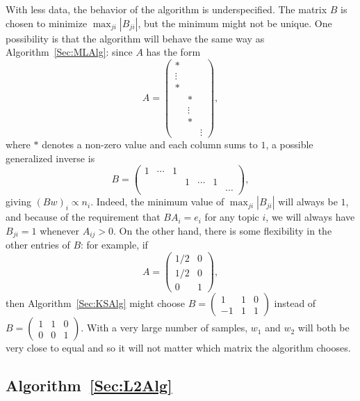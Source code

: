 \documentclass{article}
\begin{document}
With less data, the behavior of the algorithm is underspecified.
The matrix \(B\) is chosen to minimize \(\max_{ji} |B_{ji}|\), but the minimum might not be unique.
One possibility is that the algorithm will behave the same way as Algorithm~\ref{Sec:MLAlg}: since \(A\) has the form
\[
    A =
    \begin{pmatrix}
        *      &        &
    \\  \vdots &        &
    \\  *      &        &
    \\         & *      &
    \\         & \vdots &
    \\         & *      &
    \\         &        & \vdots
    \end{pmatrix}
    ,
\]
    where \(*\) denotes a non-zero value and each column sums to \(1\), a possible generalized inverse is
\[
    B =
    \begin{pmatrix}
        1 & \cdots & 1 &   &        &   &
    \\    &        &   & 1 & \cdots & 1 &
    \\    &        &   &   &        &   & \cdots
    \end{pmatrix}
    ,
\]
    giving \((B w)_i \propto n_i\).
Indeed, the minimum value of \(\max_{ji} |B_{ji}|\) will always be \(1\), and because of the requirement that \(B A_i = e_i\) for any topic \(i\), we will always have \(B_{ji} = 1\) whenever \(A_{ij} > 0\).
On the other hand, there is some flexibility in the other entries of \(B\): for example, if
\[
    A =
    \begin{pmatrix}
        1/2 & 0
    \\  1/2 & 0
    \\  0   & 1
    \end{pmatrix}
    ,
\]
    then Algorithm~\ref{Sec:KSAlg} might choose
\(
    B =
    \begin{pmatrix}
         1 & 1 & 0
    \\  -1 & 1 & 1
    \end{pmatrix}
\)
instead of
\(
    B =
    \begin{pmatrix}
        1 & 1 & 0
    \\  0 & 0 & 1
    \end{pmatrix}
\).
With a very large number of samples, \(w_1\) and \(w_2\) will both be very close to equal and so it will not matter which matrix the algorithm chooses.

\subsection{Algorithm~\ref{Sec:L2Alg}}
\end{document}

